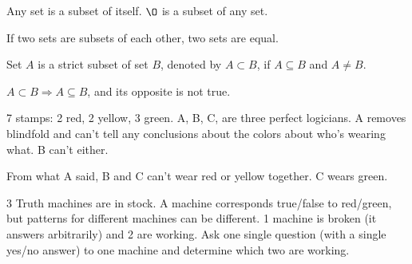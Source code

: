 \begin{theorem}
Any set is a subset of itself. $\O$ is a subset of any set. 
\end{theorem}

If two sets are subsets of each other, two sets are equal.

\begin{defn}
Set $A$ is a strict subset of set $B$, denoted by $A \subset B$, if $A \subseteq B$ and $A \neq B$. 
\end{defn}

$A \subset B \Rightarrow A \subseteq B$, and its opposite is not true.

\begin{ex}
7 stamps: 2 red, 2 yellow, 3 green. A, B, C, are three perfect logicians. A removes blindfold and can't tell any conclusions about the colors about who's wearing what. B can't either.

From what A said, B and C can't wear red or yellow together. C wears green.
\end{ex}

\begin{ex}
3 Truth machines are in stock. A machine corresponds true/false to red/green, but patterns for different machines can be different. 1 machine is broken (it answers arbitrarily) and 2 are working. Ask one single question (with a single yes/no answer) to one machine and determine which two are working.
\end{ex}